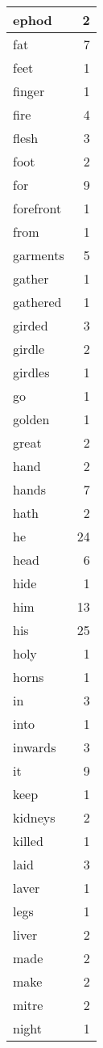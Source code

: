 \begin{center}
\begin{longtable}{l|r}
ephod & 2 \\ \hline
fat & 7 \\ \hline
feet & 1 \\ \hline
finger & 1 \\ \hline
fire & 4 \\ \hline
flesh & 3 \\ \hline
foot & 2 \\ \hline
for & 9 \\ \hline
forefront & 1 \\ \hline
from & 1 \\ \hline
garments & 5 \\ \hline
gather & 1 \\ \hline
gathered & 1 \\ \hline
girded & 3 \\ \hline
girdle & 2 \\ \hline
girdles & 1 \\ \hline
go & 1 \\ \hline
golden & 1 \\ \hline
great & 2 \\ \hline
hand & 2 \\ \hline
hands & 7 \\ \hline
hath & 2 \\ \hline
he & 24 \\ \hline
head & 6 \\ \hline
hide & 1 \\ \hline
him & 13 \\ \hline
his & 25 \\ \hline
holy & 1 \\ \hline
horns & 1 \\ \hline
in & 3 \\ \hline
into & 1 \\ \hline
inwards & 3 \\ \hline
it & 9 \\ \hline
keep & 1 \\ \hline
kidneys & 2 \\ \hline
killed & 1 \\ \hline
laid & 3 \\ \hline
laver & 1 \\ \hline
legs & 1 \\ \hline
liver & 2 \\ \hline
made & 2 \\ \hline
make & 2 \\ \hline
mitre & 2 \\ \hline
night & 1 \\ \hline

\end{longtable}
\end{center}
